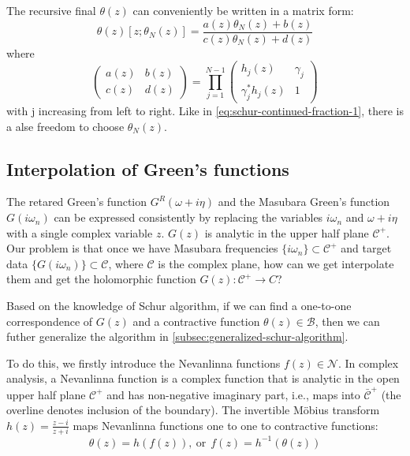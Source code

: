 \documentclass[
	preprint,%
	aps,
	prb,
	showpacs,	
	amsmath, amssymb]{revtex4-2}
\newcommand{\C}{ {\mathcal{C}} }
\newcommand{\Cbar}{ {\bar{\mathcal{C}}} }
\newcommand{\B}{ {\mathcal{B}} }
\newcommand{\N}{ {\mathcal{N}} }
\begin{document}
The recursive final $\theta(z)$ can conveniently be written in a
matrix form:
\begin{equation}\label{eq:recursive-theta}
	\theta(z)[z;\theta_N(z)] 
		= \frac{a(z)\theta_N(z) + b(z)}{c(z)\theta_N(z) + d(z)}
\end{equation}
where
\begin{equation}\label{eq:factor-matrix}
	\left(
		\begin{matrix}
			a(z) & b(z) \\
			c(z) & d(z)
		\end{matrix}
	\right) = \prod_{j=1}^{N-1}
	\left(
		\begin{matrix}
			h_j(z)            & \gamma_j \\
			\gamma_j^* h_j(z) & 1
		\end{matrix}
	\right)
\end{equation}
with j increasing from left to right. Like in \cref{eq:schur-continued-fraction-1}, 
there is a alse freedom to choose $\theta_N(z)$.


\subsection{Interpolation of Green's functions}
\label{subsec:interpolation-of-GF}

The retared Green's function $G^R(\omega + i\eta)$ and the Masubara 
Green's function $G(i\omega_n)$ can be expressed consistently by replacing 
the variables $i\omega_n$ and $\omega + i\eta$ with a single complex 
variable $z$. $G(z)$ is analytic in the upper half plane $\C^+$. 
Our problem is that once we have Masubara frequencies 
$\{i\omega_n\} \subset \C^+$ 
and target data $\{ G(i\omega_n)\} \subset  \C$, where $\C$ is 
the complex plane, how can we get interpolate them and get the 
holomorphic function $G(z):\C^+ \to C$?

Based on the knowledge of Schur algorithm, if we can find 
a one-to-one correspondence of $G(z)$ and a contractive 
function $\theta(z) \in \B$, then we can futher generalize 
the algorithm in \cref{subsec:generalized-schur-algorithm}.

To do this, we firstly introduce the Nevanlinna functions $f(z) \in \N$.
In complex analysis, a Nevanlinna function is a complex
function that is analytic in the open upper half plane $\C^+$ and
has non-negative imaginary part, i.e., maps into $\Cbar^+$ (the
overline denotes inclusion of the boundary).
The invertible Möbius transform $h(z) = \frac{z-i}{z+i}$ 
maps Nevanlinna functions one to one to contractive
functions:
\begin{equation}\label{eq:f-theta-relation}
	\theta(z) = h(f(z)),\ \mathrm{or} \ \
	f(z) = h^{-1}(\theta(z))
\end{equation}
\end{document}
